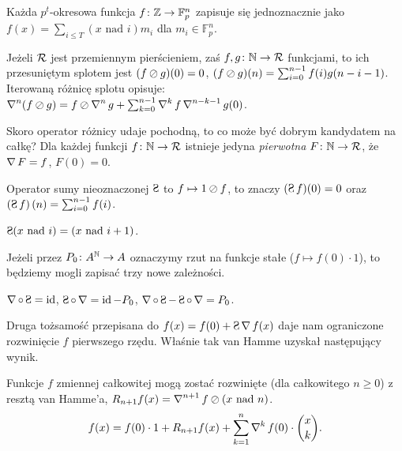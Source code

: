 \begin{fakt}
	Każda $p^t$-okresowa funkcja $f \colon \mathbb Z \to \mathbb F_p^n$ zapisuje się jednoznacznie jako $f(x) = \sum_{i \le T} (x \mbox{ nad }i) m_i$ dla $m_i \in \mathbb F_p^n$.
\end{fakt}

Jeżeli $\mathcal R$ jest przemiennym pierścieniem, zaś $f, g \colon \mathbb N \to \mathcal R$ funkcjami, to ich przesuniętym splotem jest $(f \oslash g)(0) = 0$, $(f \oslash g) (n) = \sum_{i=0}^{n-1} f(i) g(n-i-1)$.
Iterowaną różnicę splotu opisuje: $\operatorname{\nabla}^n (f \oslash g) = f \oslash \operatorname{\nabla}^n g + \sum_{k=0}^{n-1} \operatorname{\nabla}^k f \operatorname{\nabla}^{n-k-1} g (0)$.

Skoro operator różnicy udaje pochodną, to co może być dobrym kandydatem na całkę?
Dla każdej funkcji $f \colon \mathbb N \to \mathcal R$ istnieje jedyna \emph{pierwotna} $F \colon \mathbb N \to \mathcal R$, że $\operatorname{\nabla} F = f$, $F(0) = 0$.

\begin{definicja}
	Operator sumy nieoznaczonej $\suma$ to $f \mapsto 1 \oslash f$, to znaczy $(\suma f)(0) = 0$ oraz $\left(\suma f \right)(n) = \sum_{i=0}^{n-1} f(i)$.
\end{definicja}

\begin{przyklad}
	$\suma (x \mbox{ nad } i) = (x \mbox{ nad } i+1)$.
\end{przyklad}

Jeżeli przez $P_0 \colon A^\mathbb N \to A$ oznaczymy rzut na funkcje stałe ($f \mapsto f(0) \cdot 1$), to będziemy mogli zapisać trzy nowe zależności.

\begin{fakt}
	$\findif \circ \suma = \operatorname{id}$, 
	$\suma \circ \findif = \operatorname{id} - P_0$, 
	$\findif \circ \suma - \suma \circ \findif = P_0$.
\end{fakt}

Druga tożsamość przepisana do $f(x) = f(0) + \suma \findif f(x)$ daje nam ograniczone rozwinięcie $f$ pierwszego rzędu. 
Właśnie tak van Hamme uzyskał następujący wynik.

\begin{twierdzenie}
	Funkcje $f$ zmiennej całkowitej mogą zostać rozwinięte (dla całkowitego $n \ge 0$) z resztą van Hamme'a, $R_{n+1} f(x) = \operatorname{\nabla}^{n+1} f \oslash (x \mbox{ nad } n)$.
	\[
		f(x) = f(0) \cdot 1 + R_{n+1} f(x) + \sum_{k=1}^n \operatorname{\nabla}^k f(0) \cdot {x \choose k}.	
	\]
\end{twierdzenie}